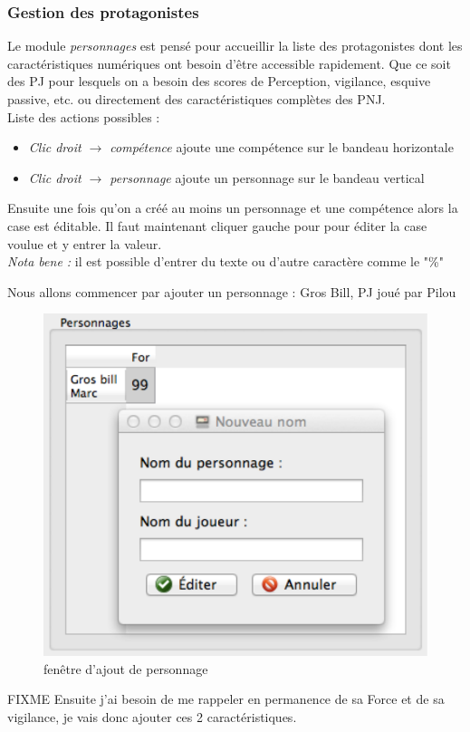 \documentclass[12pt]{article}
\begin{document}
\subsubsection{Gestion des protagonistes}\label{personnage}
Le module \emph{personnages} est pensé pour accueillir la liste des protagonistes dont les caractéristiques numériques ont besoin d'être accessible rapidement. Que ce soit des PJ pour lesquels on a besoin des scores de Perception, vigilance, esquive passive, etc. ou directement des caractéristiques complètes des PNJ.
\\
Liste des actions possibles :
\begin{itemize}
    \item \emph{Clic droit $\rightarrow$ compétence} ajoute une compétence sur le bandeau horizontale
    \item \emph{Clic droit $\rightarrow$ personnage} ajoute un personnage sur le bandeau vertical 
\end{itemize}
Ensuite une fois qu'on a créé au moins un personnage et une compétence alors la case est éditable. Il faut maintenant cliquer gauche pour pour éditer la case voulue et y entrer la valeur.
\\\emph{Nota bene :} il est possible d'entrer du texte ou d'autre caractère comme le "\%"

Nous allons commencer par ajouter un personnage : Gros Bill, PJ joué par Pilou
\begin{figure}
    \includegraphics[scale=0.6]{add_character}
    \caption{fenêtre d'ajout de personnage}
\end{figure}
FIXME Ensuite j'ai besoin de me rappeler en permanence de sa Force et de sa vigilance, je vais donc ajouter ces 2 caractéristiques.
\end{document}
